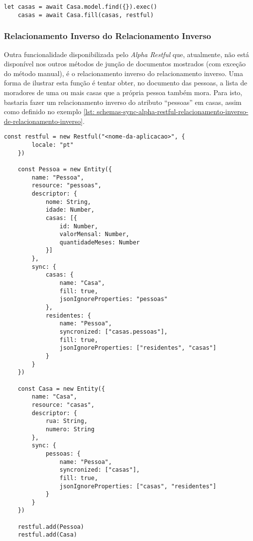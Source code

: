\begin{lstlisting}[style=ES6, caption={Junção Com o \textit{Alpha Restful} em Relacionamento Inverso\label{lst: resultado-juncao-schemas-sync-alpha-restful-relacionamento-inverso}}]
	let casas = await Casa.model.find({}).exec()
	casas = await Casa.fill(casas, restful)
\end{lstlisting}

\subsubsection{Relacionamento Inverso do Relacionamento Inverso}

Outra funcionalidade disponibilizada pelo \textit{Alpha Restful} que, atualmente, não está disponível nos outros métodos de junção de documentos mostrados (com exceção do método manual), é o relacionamento inverso do relacionamento inverso. Uma forma de ilustrar esta função é tentar obter, no documento das pessoas, a lista de moradores de uma ou mais casas que a própria pessoa também mora. Para isto, bastaria fazer um relacionamento inverso do atributo ``pessoas'' em casas, assim como definido no exemplo \ref{lst: schemas-sync-alpha-restful-relacionamento-inverso-de-relacionamento-inverso}.

\begin{lstlisting}[style=ES6, caption={Relacionamento Inverso de Relacionamento Inverso \label{lst: schemas-sync-alpha-restful-relacionamento-inverso-de-relacionamento-inverso}}]
    const restful = new Restful("<nome-da-aplicacao>", {
        locale: "pt"
    })

    const Pessoa = new Entity({
        name: "Pessoa",
        resource: "pessoas",
        descriptor: {
            nome: String,
            idade: Number,
            casas: [{
                id: Number,
                valorMensal: Number,
                quantidadeMeses: Number
            }]
        },
        sync: {
            casas: {
                name: "Casa",
                fill: true,
                jsonIgnoreProperties: "pessoas"
            },
            residentes: {
                name: "Pessoa",
                syncronized: ["casas.pessoas"],
                fill: true,
                jsonIgnoreProperties: ["residentes", "casas"]
            }
        }
    })
    
    const Casa = new Entity({
        name: "Casa",
        resource: "casas",
        descriptor: {
            rua: String,
            numero: String
        },
        sync: {
            pessoas: {
                name: "Pessoa",
                syncronized: ["casas"],
                fill: true,
                jsonIgnoreProperties: ["casas", "residentes"]
            }
        }
    })
    
    restful.add(Pessoa)
    restful.add(Casa)
\end{lstlisting}


